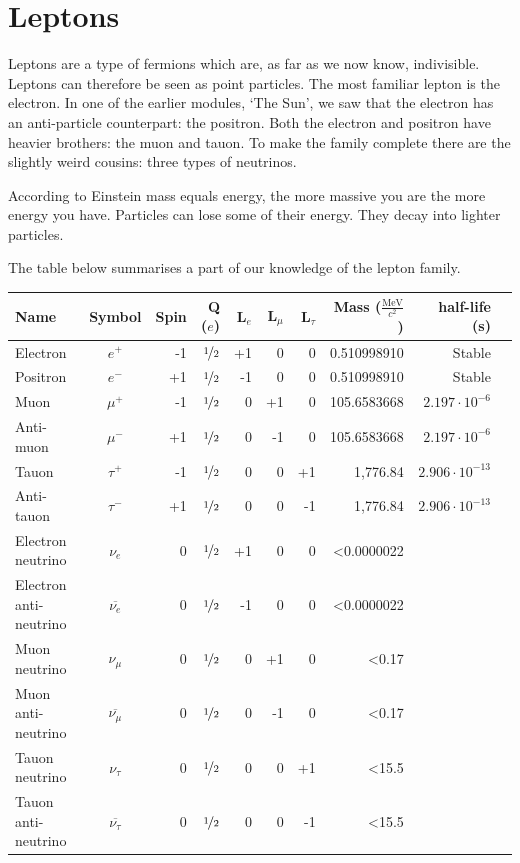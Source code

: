 \documentclass[12pt,a4paper]{article}
\numberwithin{equation}{section}
\numberwithin{figure}{section}
\numberwithin{table}{section}
\begin{document}
\section{Leptons}
Leptons are a type of fermions which are, as far as we now know, indivisible. Leptons can therefore be seen as point particles. The most familiar lepton is the electron. In one of the earlier modules, `The Sun', we saw that the electron has an anti-particle counterpart: the positron. Both the electron and positron have heavier brothers: the muon and tauon. To make the family complete there are the slightly weird cousins: three types of neutrinos.

According to Einstein mass equals energy, the more massive you are the more energy you have. Particles can lose some of their energy. They decay into lighter particles.

The table below summarises a part of our knowledge of the lepton family.

\begin{center}\begin{small}
\begin{tabular}[h]{l c r r r r r r r r} 
Name & Symbol & Spin & Q ($e$) & L$_e$ & L$_{\mu}$  & L$_{\tau}$  & Mass ($\frac{\mbox{MeV}}{c^2}$) & half-life (s) \\ \hline \hline
Electron & $e^+$ & -1 & $\nicefrac{1}{2}$ & +1 & 0 & 0 & 0.510998910 & Stable \\ 
Positron & $e^-$ & +1 & $\nicefrac{1}{2}$ & -1 & 0 & 0 & 0.510998910 & Stable \\ \hline
Muon & $\mu^+$ & -1 & $\nicefrac{1}{2}$ & 0 & +1 & 0 & 105.6583668 &  $2.197 \cdot 10^{-6}$ \\ 
Anti-muon & $\mu^-$ & +1 & $\nicefrac{1}{2}$ & 0 & -1 & 0 & 105.6583668 & $2.197 \cdot 10^{-6}$ \\ \hline
Tauon & $\tau^+$ & -1 & $\nicefrac{1}{2}$ & 0 & 0 & +1 & 1,776.84 & $2.906 \cdot 10^{-13}$ \\ 
Anti-tauon & $\tau^-$ & +1 & $\nicefrac{1}{2}$ & 0 & 0 & -1 & 1,776.84 &  $2.906 \cdot 10^{-13}$ \\ \hline
Electron neutrino & $\nu_e$ & 0 & $\nicefrac{1}{2}$ & +1 & 0 & 0 & \textless 0.0000022 &  \\ 
Electron anti-neutrino & $\overline{\nu_e}$ & 0 & $\nicefrac{1}{2}$ & -1 & 0 & 0 & \textless 0.0000022 &  \\ \hline
Muon neutrino & $\nu_{\mu}$ & 0 & $\nicefrac{1}{2}$ & 0 & +1 & 0 & \textless 0.17 &  \\ 
Muon anti-neutrino & $\overline{\nu_{\mu}}$ & 0 & $\nicefrac{1}{2}$ & 0 & -1 & 0 & \textless 0.17 &  \\ \hline
Tauon neutrino & $\nu_{\tau}$ & 0 & $\nicefrac{1}{2}$ & 0 & 0 & +1 & \textless 15.5 &  \\ 
Tauon anti-neutrino & $\overline{\nu_{\tau}}$ & 0 & $\nicefrac{1}{2}$ & 0 & 0 & -1 & \textless 15.5 &  \\ \hline
\end{tabular}\end{small}
\label{tab:leptons}
\end{center}
\end{document}
